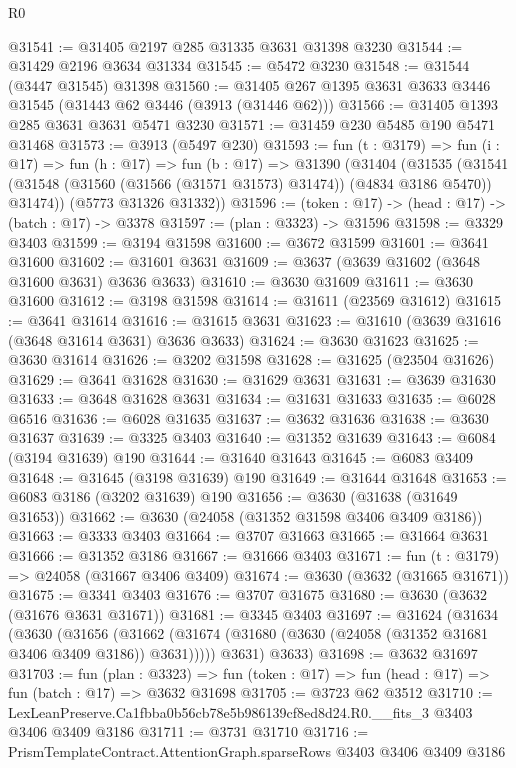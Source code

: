 \begin{lexlean}{R0}
\begin{coremodule}
@31541 := @31405 @2197 @285 @31335 @3631 @31398 @3230
@31544 := @31429 @2196 @3634 @31334
@31545 := @5472 @3230
@31548 := @31544 (@3447 @31545) @31398
@31560 := @31405 @267 @1395 @3631 @3633 @3446 @31545 (@31443 @62 @3446 (@3913 (@31446 @62)))
@31566 := @31405 @1393 @285 @3631 @3631 @5471 @3230
@31571 := @31459 @230 @5485 @190 @5471 @31468
@31573 := @3913 (@5497 @230)
@31593 := fun (t : @3179) =>
  fun (i : @17) =>
  fun (h : @17) =>
  fun (b : @17) =>
  @31390
    (@31404
      (@31535 (@31541 (@31548 (@31560 (@31566 (@31571 @31573) @31474)) (@4834 @3186 @5470)) @31474))
      (@5773 @31326 @31332))
@31596 := (token : @17) -> (head : @17) -> (batch : @17) -> @3378
@31597 := (plan : @3323) -> @31596
@31598 := @3329 @3403
@31599 := @3194 @31598
@31600 := @3672 @31599
@31601 := @3641 @31600
@31602 := @31601 @3631
@31609 := @3637 (@3639 @31602 (@3648 @31600 @3631) @3636 @3633)
@31610 := @3630 @31609
@31611 := @3630 @31600
@31612 := @3198 @31598
@31614 := @31611 (@23569 @31612)
@31615 := @3641 @31614
@31616 := @31615 @3631
@31623 := @31610 (@3639 @31616 (@3648 @31614 @3631) @3636 @3633)
@31624 := @3630 @31623
@31625 := @3630 @31614
@31626 := @3202 @31598
@31628 := @31625 (@23504 @31626)
@31629 := @3641 @31628
@31630 := @31629 @3631
@31631 := @3639 @31630
@31633 := @3648 @31628 @3631
@31634 := @31631 @31633
@31635 := @6028 @6516
@31636 := @6028 @31635
@31637 := @3632 @31636
@31638 := @3630 @31637
@31639 := @3325 @3403
@31640 := @31352 @31639
@31643 := @6084 (@3194 @31639) @190
@31644 := @31640 @31643
@31645 := @6083 @3409
@31648 := @31645 (@3198 @31639) @190
@31649 := @31644 @31648
@31653 := @6083 @3186 (@3202 @31639) @190
@31656 := @3630 (@31638 (@31649 @31653))
@31662 := @3630 (@24058 (@31352 @31598 @3406 @3409 @3186))
@31663 := @3333 @3403
@31664 := @3707 @31663
@31665 := @31664 @3631
@31666 := @31352 @3186
@31667 := @31666 @3403
@31671 := fun (t : @3179) => @24058 (@31667 @3406 @3409)
@31674 := @3630 (@3632 (@31665 @31671))
@31675 := @3341 @3403
@31676 := @3707 @31675
@31680 := @3630 (@3632 (@31676 @3631 @31671))
@31681 := @3345 @3403
@31697 := @31624
    (@31634
      (@3630
        (@31656 (@31662 (@31674 (@31680 (@3630 (@24058 (@31352 @31681 @3406 @3409 @3186)) @3631)))))
        @3631)
      @3633)
@31698 := @3632 @31697
@31703 := fun (plan : @3323) =>
  fun (token : @17) => fun (head : @17) => fun (batch : @17) => @3632 @31698
@31705 := @3723 @62 @3512
@31710 := LexLeanPreserve.Ca1fbba0b56cb78e5b986139cf8ed8d24.R0.__fits_3 @3403 @3406 @3409 @3186
@31711 := @3731 @31710
@31716 := PrismTemplateContract.AttentionGraph.sparseRows @3403 @3406 @3409 @3186

\end{coremodule}
\end{lexlean}
